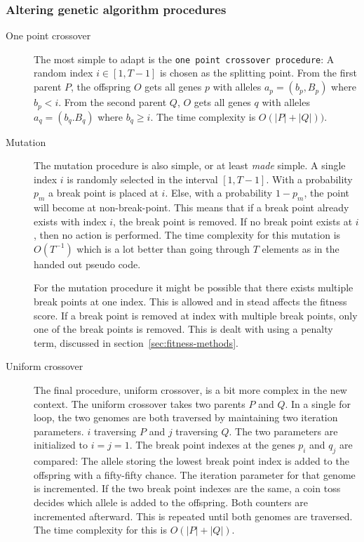 \subsubsection{Altering genetic algorithm procedures}
\label{sec:altering-procedures}

\begin{description}
    \item[One point crossover] The most simple to adapt is the \texttt{one point
    crossover procedure}: A random index $i \in [1, T-1]$ is chosen as the
    splitting point. From the first parent $P$, the offspring $O$ gets all genes
    $p$ with alleles $a_p = (b_p, B_p)$ where $b_p < i$. From the second parent
    $Q$, $O$ gets all genes $q$ with alleles $a_q = (b_q. B_q)$ where $b_q \geq
    i$. The time complexity is $O(|P| + |Q|))$.
    
    
    \item [Mutation] The mutation procedure is also simple, or at least
    \textit{made} simple. A single index $i$ is randomly selected in the
    interval $[1, T - 1]$. With a probability $p_m$ a break point is placed at
    $i$. Else, with a probability $1 - p_m$, the point will become at
    non-break-point. This means that if a break point already exists with index
    $i$, the break point is removed. If no break point exists at $i$, then no
    action is performed. The time complexity for this mutation is $O(T^{-1})$
    which is a lot better than going through $T$ elements as in the handed out
    pseudo code. 
    
    For the mutation procedure it might be possible that there exists multiple
    break points at one index. This is allowed and in stead affects the fitness
    score. If a break point is removed at index with multiple break points, only
    one of the break points is removed. This is dealt with using a penalty term,
    discussed in section~\ref{sec:fitness-methods}.
    

    \item [Uniform crossover] The final procedure, uniform crossover, is a bit
    more complex in the new context. The uniform crossover takes two parents $P$
    and $Q$. In a single for loop, the two genomes are both traversed by
    maintaining two iteration parameters. $i$ traversing $P$ and $j$ traversing
    $Q$. The two parameters are initialized to $i = j = 1$. The break point
    indexes at the genes $p_i$ and $q_j$ are compared: The allele storing the
    lowest break point index is added to the offspring with a fifty-fifty
    chance. The iteration parameter for that genome is incremented. If the two
    break point indexes are the same, a coin toss decides which allele is added
    to the offspring. Both counters are incremented afterward. This is repeated
    until both genomes are traversed. The time complexity for this is $O(|P|
    + |Q|)$. 
    

\end{description}
